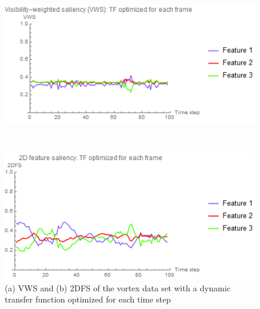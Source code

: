 \begin{figure}
	\centering
	\begin{minipage}{.49\textwidth}
		\includegraphics[width=1\linewidth]{images/vorts_optimized_parallelsearch_VWS}
		\subcaption{}
	\end{minipage}~
	\begin{minipage}{.49\textwidth}
		\includegraphics[width=1\linewidth]{images/vorts_optimized_parallelsearch_2DFS}
		\subcaption{}
	\end{minipage}
	\caption{(a) VWS and (b) 2DFS of the vortex data set with a dynamic transfer function optimized for each time step}
	\label{fig:vorts_dynamic}
\end{figure}

